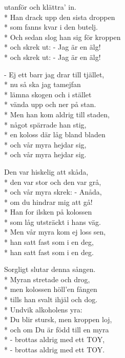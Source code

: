 \begin{SongText}
\begin{SongVerse}
utanför och klättra' in.\\*%
Han drack upp den sista droppen\\*%
som fanns kvar i den butelj.\\*%
Och sedan slog han sig för kroppen\\*%
och skrek ut: - Jag är en älg!\\*%
och skrek ut: - Jag är en älg!
\end{SongVerse}
\begin{SongVerse}
- Ej ett barr jag drar till tjället,\\*%
nu så ska jag tamejfan\\*%
lämna skogen och i stället\\*%
vända upp och ner på stan.\\*%
Men han kom aldrig till staden,\\*%
något spärrade han stig,\\*%
en koloss där låg bland bladen\\*%
och vår myra hejdar sig,\\*%
och vår myra hejdar sig.
\end{SongVerse}
\begin{SongVerse}
Den var hiskelig att skåda,\\*%
den var stor och den var grå,\\*%
och vår myra skrek: - Anåda,\\*%
om du hindrar mig att gå!\\*%
Han for ilsken på kolossen\\*%
som låg utsträckt i hans väg.\\*%
Men vår myra kom ej loss sen,\\*%
han satt fast som i en deg,\\*%
han satt fast som i en deg. 
\end{SongVerse}
\begin{SongVerse}
Sorgligt slutar denna sången.\\*%
Myran stretade och drog,\\*%
men kolossen höll'en fången\\*%
tills han svalt ihjäl och dog.\\*%
Undvik alkoholens yra:\\*%
Du blir stursk, men kroppen loj,\\*%
och om Du är född till en myra\\*%
- brottas aldrig med ett TOY,\\*%
- brottas aldrig med ett TOY. 
\end{SongVerse}
\end{SongText}
